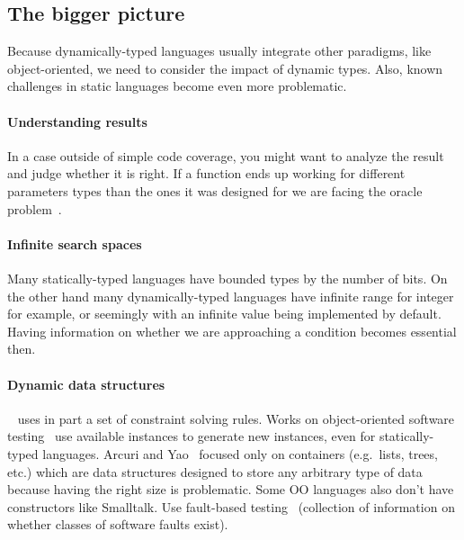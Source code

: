\documentclass{llncs2e/llncs}
\begin{document}
\subsection{The bigger picture}
Because dynamically-typed languages usually integrate other paradigms, like
object-oriented, we need to consider the impact of dynamic types. Also, known
challenges in static languages become even more problematic.

\paragraph{Understanding results} In a case outside of simple code coverage, you
might want to analyze the result and judge whether it is right. If a function
ends up working for different parameters types than the ones it was designed for
we are facing the oracle problem~\cite{barr2015oracle}.

\paragraph{Infinite search spaces} Many statically-typed languages have bounded
types by the number of bits. On the other hand many dynamically-typed languages
have infinite range for integer for example, or seemingly with an infinite value
being implemented by default. Having information on whether we are approaching a
condition becomes essential then.

\paragraph{Dynamic data structures}~\cite{lakhotia2008handling} uses in part a
set of constraint solving rules. Works on object-oriented software
testing~\cite{tonella2004evolutionary,ciupa2008artoo} use available instances to
generate new instances, even for statically-typed languages. Arcuri and
Yao~\cite{arcuri2008search} focused only on containers (e.g.\ lists, trees,
etc.) which are data structures designed to store any arbitrary type of data
because having the right size is problematic. Some OO languages also don't have
constructors like Smalltalk. Use fault-based testing~\cite{hayes1994testing}
(collection of information on whether classes of software faults exist).
\end{document}
